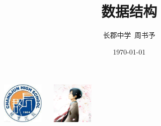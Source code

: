 \documentclass{beamer}
\title{数据结构}
\author{长郡中学\ 周书予}
\date{\today}
\begin{document}
\small
	
	\begin{frame}
	\titlepage
		\begin{center}
		\includegraphics[width=2.0cm]{cj.jpg}
		$\ \ \ \ \ $
		\includegraphics[width=2.0cm]{zsy.png}
		\end{center}
	\end{frame}
\end{document}
